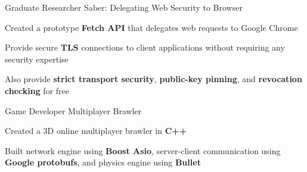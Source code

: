 


\begin{cventries}


\cventry
{Graduate Researcher} %
{Saber: Delegating Web Security to Browser} %
{} %
{} %
{ %
\begin{cvitems}
\item{Created a prototype \textbf{Fetch API} that delegates web requests to Google Chrome}
\item{Provide secure \textbf{TLS} connections to client applications without requiring any security expertise}
\item{Also provide \textbf{strict transport security}, \textbf{public-key pinning}, and \textbf{revocation checking} for free}
\end{cvitems}
}


\cventry
{Game Developer} %
{Multiplayer Brawler} %
{} %
{} %
{ %
\begin{cvitems}
\item{Created a 3D online multiplayer brawler in \textbf{C++}}
\item{Built network engine using \textbf{Boost Asio}, server-client communication using \textbf{Google protobufs}, and physics engine using \textbf{Bullet}}
\end{cvitems}
}


\end{cventries}
